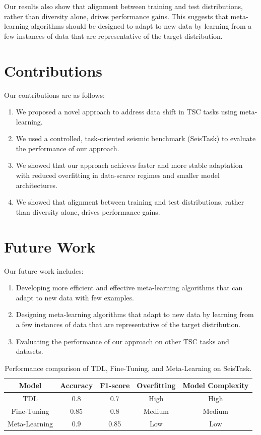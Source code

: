 \documentclass{article}
\begin{document}
Our results also show that alignment between training and test distributions, rather than diversity alone, drives performance gains. This suggests that meta-learning algorithms should be designed to adapt to new data by learning from a few instances of data that are representative of the target distribution.

\section{Contributions}
Our contributions are as follows:

\begin{enumerate}
\item We proposed a novel approach to address data shift in TSC tasks using meta-learning.
\item We used a controlled, task-oriented seismic benchmark (SeisTask) to evaluate the performance of our approach.
\item We showed that our approach achieves faster and more stable adaptation with reduced overfitting in data-scarce regimes and smaller model architectures.
\item We showed that alignment between training and test distributions, rather than diversity alone, drives performance gains.
\end{enumerate}

\section{Future Work}
Our future work includes:

\begin{enumerate}
\item Developing more efficient and effective meta-learning algorithms that can adapt to new data with few examples.
\item Designing meta-learning algorithms that adapt to new data by learning from a few instances of data that are representative of the target distribution.
\item Evaluating the performance of our approach on other TSC tasks and datasets.
\end{enumerate}

\begin{table}[h!]
\centering
\begin{tabular}{|c|c|c|c|c|}
\hline
\textbf{Model} & \textbf{Accuracy} & \textbf{F1-score} & \textbf{Overfitting} & \textbf{Model Complexity} \\
\hline
TDL & 0.8 & 0.7 & High & High \\
\hline
Fine-Tuning & 0.85 & 0.8 & Medium & Medium \\
\hline
Meta-Learning & 0.9 & 0.85 & Low & Low \\
\hline
\end{tabular}
\caption{Performance comparison of TDL, Fine-Tuning, and Meta-Learning on SeisTask.}
\label{tab:performance_comparison}
\end{table}
\end{document}
